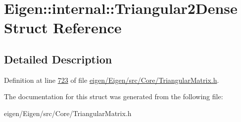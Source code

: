 \hypertarget{struct_eigen_1_1internal_1_1_triangular2_dense}{}\section{Eigen\+:\+:internal\+:\+:Triangular2\+Dense Struct Reference}
\label{struct_eigen_1_1internal_1_1_triangular2_dense}


\subsection{Detailed Description}


Definition at line \hyperlink{eigen_2_eigen_2src_2_core_2_triangular_matrix_8h_source_l00723}{723} of file \hyperlink{eigen_2_eigen_2src_2_core_2_triangular_matrix_8h_source}{eigen/\+Eigen/src/\+Core/\+Triangular\+Matrix.\+h}.



The documentation for this struct was generated from the following file\+:\begin{DoxyCompactItemize}
\item 
eigen/\+Eigen/src/\+Core/\+Triangular\+Matrix.\+h\end{DoxyCompactItemize}
